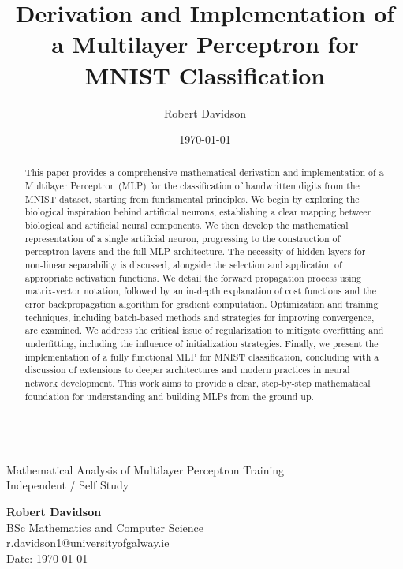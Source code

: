 \documentclass[9pt]{extarticle}
\title{Derivation and Implementation of a Multilayer Perceptron for MNIST Classification}
\author{Robert Davidson}
\date{\today}
\theoremstyle{plain}
\theoremstyle{definition}
\theoremstyle{remark}
\begin{document}
\begin{center}
     \\
    \vspace{0.5cm}
    Mathematical Analysis of Multilayer Perceptron Training\\
    Independent / Self Study\\[24pt]
    \LARGE

    \Large
    \textbf{Robert Davidson}\\[6pt]
    \small
    BSc Mathematics and Computer Science \\ r.davidson1@universityofgalway.ie\\[6pt]
    Date: \today\\[12pt]
\end{center}
\begin{abstract}
    \begin{adjustwidth}{1cm}{1cm}
        This paper provides a comprehensive mathematical derivation and implementation of a Multilayer Perceptron (MLP)
        for the classification of handwritten digits from the MNIST dataset, starting from fundamental principles.
        We begin by exploring the biological inspiration behind artificial neurons, establishing a clear mapping between biological and artificial neural components.
        We then develop the mathematical representation of a single artificial neuron, progressing to the construction of perceptron layers and the full MLP architecture.
        The necessity of hidden layers for non-linear separability is discussed, alongside the selection and application of appropriate activation functions.
        We detail the forward propagation process using matrix-vector notation, followed by an in-depth explanation of cost functions and the error backpropagation algorithm
        for gradient computation. Optimization and training techniques, including batch-based methods and strategies for improving convergence, are examined.
        We address the critical issue of regularization to mitigate overfitting and underfitting, including the influence of initialization strategies.
        Finally, we present the implementation of a fully functional MLP for MNIST classification, concluding with a discussion of extensions to deeper architectures
        and modern practices in neural network development. This work aims to provide a clear, step-by-step mathematical foundation for understanding and building MLPs from the ground up.
    \end{adjustwidth}
\end{abstract}
\end{document}
